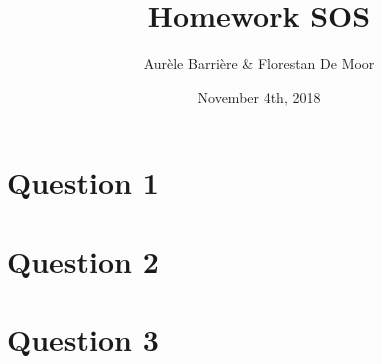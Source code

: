 \documentclass{article}
\title{Homework SOS}
\author{Aur\`ele Barri\`ere \& Florestan De Moor}
\date{November 4th, 2018}
\begin{document}
\maketitle

\section*{Question 1}


\section*{Question 2}


\section*{Question 3}

\end{document}

